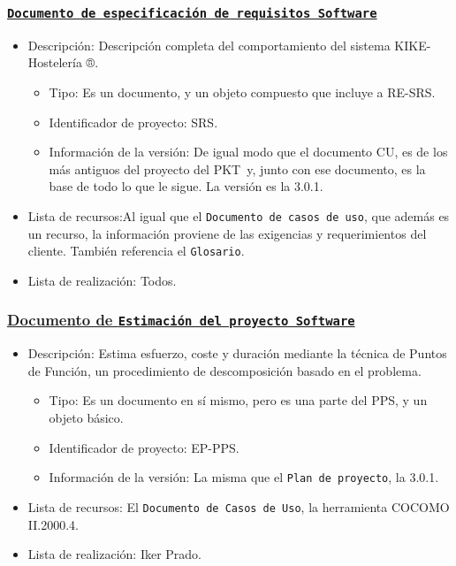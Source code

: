 \documentclass[spanish,a4paper,11pt, twoside]{report}	%
\newcommand*{\PKT}{\hbox{P}\kern-2.5pt\lower3.5pt\hbox{\small{K}}\kern-2.8pt\hbox{T}\kern-2pt}	%
\begin{document}
			\subsubsection{\texttt{\underline{Documento de especificación de requisitos Software}}}
			\begin{itemize}	
				\item{Descripción:} Descripción completa del comportamiento del sistema KIKE- Hostelería ®.
					\begin{itemize}	
						\item{Tipo:} Es un documento, y un objeto compuesto que incluye a RE-SRS. 
						\item{Identificador de proyecto:} SRS.
						\item{Información de la versión:} De igual modo que el documento CU, es de los más antiguos del proyecto del \PKT \ y, junto con ese documento, es la base de todo lo que le sigue. La versión es la 3.0.1.
					\end{itemize}	
				\item{Lista de recursos:}Al igual que el \texttt{Documento de casos de uso}, que además  es un recurso, la información proviene de las exigencias y requerimientos del cliente. También referencia el \texttt{Glosario}.
				\item{Lista de realización:} Todos.
			\end{itemize}			

			\subsubsection{\underline{Documento de \texttt{Estimación del proyecto Software}}}
			\begin{itemize}	
				\item{Descripción:} Estima esfuerzo, coste y duración mediante la técnica de Puntos de Función, un procedimiento de descomposición basado en el problema.
					\begin{itemize}	
						\item{Tipo:} Es un documento en sí mismo, pero es una parte del PPS, y un objeto básico. 
						\item{Identificador de proyecto:} EP-PPS.
						\item{Información de la versión:} La misma que el \texttt{Plan de proyecto}, la 3.0.1.
					\end{itemize}	
				\item{Lista de recursos:} El \texttt{Documento de Casos de Uso}, la herramienta COCOMO II.2000.4.
				\item{Lista de realización:} Iker Prado.
			\end{itemize}		
			
\end{document}
